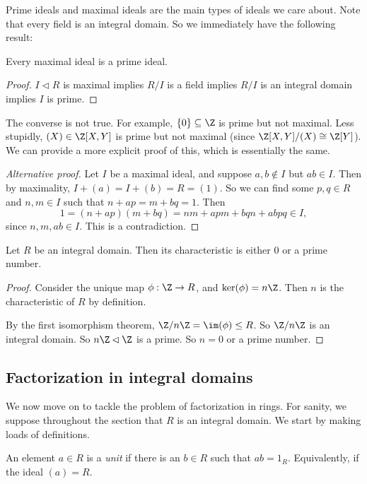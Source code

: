 \documentclass[a4paper]{article}
\begin{document}
Prime ideals and maximal ideals are the main types of ideals we care about. Note that every field is an integral domain. So we immediately have the following result:
\begin{prop}
  Every maximal ideal is a prime ideal.
\end{prop}

\begin{proof}
  $I \lhd R$ is maximal implies $R/I$ is a field implies $R/I$ is an integral domain implies $I$ is prime.
\end{proof}
The converse is not true. For example, $\{0\} \subseteq \Z$ is prime but not maximal. Less stupidly, $(X) \in \Z[X, Y]$ is prime but not maximal (since $\Z[X, Y]/(X) \cong \Z[Y]$). We can provide a more explicit proof of this, which is essentially the same.

\begin{proof}[Alternative proof]
  Let $I$ be a maximal ideal, and suppose $a, b \not \in I$ but $ab \in I$. Then by maximality, $I + (a) = I + (b) = R = (1)$. So we can find some $p, q \in R$ and $n, m \in I$ such that $n + ap = m + bq = 1$. Then
  \[
    1 = (n + ap)(m + bq) = nm + apm + bqn + ab pq \in I,
  \]
  since $n, m, ab \in I$. This is a contradiction.
\end{proof}

\begin{lemma}
  Let $R$ be an integral domain. Then its characteristic is either $0$ or a prime number.
\end{lemma}

\begin{proof}
  Consider the unique map $\phi: \Z \to R$, and $\ker(\phi) = n\Z$. Then $n$ is the characteristic of $R$ by definition.

  By the first isomorphism theorem, $\Z/n\Z = \im(\phi) \leq R$. So $\Z/n\Z$ is an integral domain. So $n\Z \lhd \Z$ is a prime. So $n = 0$ or a prime number.
\end{proof}

\subsection{Factorization in integral domains}
We now move on to tackle the problem of factorization in rings. For sanity, we suppose throughout the section that $R$ is an integral domain. We start by making loads of definitions.

\begin{defi}[Unit]
  An element $a \in R$ is a \emph{unit} if there is an $b \in R$ such that $ab = 1_R$. Equivalently, if the ideal $(a) = R$.
\end{defi}
\end{document}
